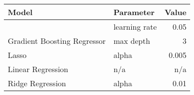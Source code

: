 
\begin{tabular}[t]{llr}
\toprule
\multicolumn{1}{l}{Model} & \multicolumn{1}{l}{Parameter} & \multicolumn{1}{l}{Value}\\
\midrule
 & learning rate & 0.05\\

\multirow[t]{-2}{*}{\raggedright\arraybackslash Gradient Boosting Regressor} & max depth & 3\\
\cmidrule(lr){1-3}

Lasso & alpha & 0.005\\
\cmidrule(lr){1-3}

Linear Regression & n/a & n/a\\
\cmidrule(lr){1-3}

Ridge Regression & alpha & 0.01\\
\bottomrule
\end{tabular}
